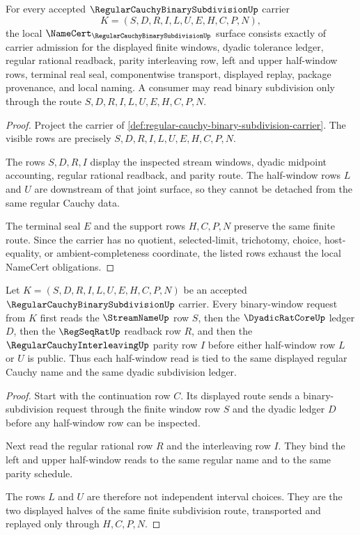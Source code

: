 \begin{theorem}
\label{thm:regular-cauchy-binary-subdivision-namecert-obligations}
For every accepted $\RegularCauchyBinarySubdivisionUp$ carrier
$$
K=(S,D,R,I,L,U,E,H,C,P,N),
$$
the local $\NameCert_{\RegularCauchyBinarySubdivisionUp}$ surface consists exactly of carrier admission for the displayed finite windows, dyadic tolerance ledger, regular rational readback, parity interleaving row, left and upper half-window rows, terminal real seal, componentwise transport, displayed replay, package provenance, and local naming. A consumer may read binary subdivision only through the route $S,D,R,I,L,U,E,H,C,P,N$.
\end{theorem}
\begin{proof}
Project the carrier of \autoref{def:regular-cauchy-binary-subdivision-carrier}. The visible rows are precisely $S,D,R,I,L,U,E,H,C,P,N$.

The rows $S,D,R,I$ display the inspected stream windows, dyadic midpoint accounting, regular rational readback, and parity route. The half-window rows $L$ and $U$ are downstream of that joint surface, so they cannot be detached from the same regular Cauchy data.

The terminal seal $E$ and the support rows $H,C,P,N$ preserve the same finite route. Since the carrier has no quotient, selected-limit, trichotomy, choice, host-equality, or ambient-completeness coordinate, the listed rows exhaust the local NameCert obligations.
\end{proof}

\begin{theorem}
\label{thm:regular-cauchy-binary-subdivision-window-halving}
Let $K=(S,D,R,I,L,U,E,H,C,P,N)$ be an accepted $\RegularCauchyBinarySubdivisionUp$ carrier. Every binary-window request from $K$ first reads the $\StreamNameUp$ row $S$, then the $\DyadicRatCoreUp$ ledger $D$, then the $\RegSeqRatUp$ readback row $R$, and then the $\RegularCauchyInterleavingUp$ parity row $I$ before either half-window row $L$ or $U$ is public. Thus each half-window read is tied to the same displayed regular Cauchy name and the same dyadic subdivision ledger.
\end{theorem}
\begin{proof}
Start with the continuation row $C$. Its displayed route sends a binary-subdivision request through the finite window row $S$ and the dyadic ledger $D$ before any half-window row can be inspected.

Next read the regular rational row $R$ and the interleaving row $I$. They bind the left and upper half-window reads to the same regular name and to the same parity schedule.

The rows $L$ and $U$ are therefore not independent interval choices. They are the two displayed halves of the same finite subdivision route, transported and replayed only through $H,C,P,N$.
\end{proof}

